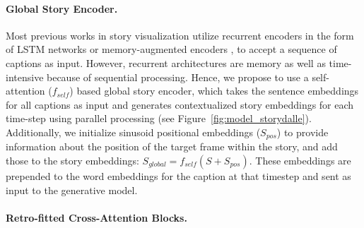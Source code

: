 \documentclass[runningheads]{llncs}
\begin{document}
\paragraph{Global Story Encoder.}
Most previous works in story visualization utilize recurrent encoders in the form of LSTM networks \cite{li2019storygan} or memory-augmented encoders \cite{maharana2021improving, maharana2021integrating}, to accept a sequence of captions as input. However, recurrent architectures are memory as well as time-intensive because of sequential processing. Hence, we propose to use a self-attention ($f_{self}$) based global story encoder, which takes the sentence embeddings for all captions as input and generates contextualized story embeddings for each time-step using parallel processing (see Figure~\ref{fig:model_storydalle}). Additionally, we initialize sinusoid positional embeddings ($S_{pos}$) to provide information about the position of the target frame within the story, and add those to the story embeddings: $S_{global} = f_{self}(S + S_{pos})$. These embeddings are prepended to the word embeddings for the caption at that timestep and sent as input to the generative model.

\paragraph{Retro-fitted Cross-Attention Blocks.}
\end{document}

